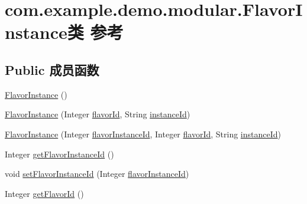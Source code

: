 \hypertarget{classcom_1_1example_1_1demo_1_1modular_1_1_flavor_instance}{}\section{com.\+example.\+demo.\+modular.\+Flavor\+Instance类 参考}
\label{classcom_1_1example_1_1demo_1_1modular_1_1_flavor_instance}
\subsection*{Public 成员函数}
\begin{DoxyCompactItemize}
\item 
\mbox{\hyperlink{classcom_1_1example_1_1demo_1_1modular_1_1_flavor_instance_a6766a0880151dfcfa45000004e7a7c0d}{Flavor\+Instance}} ()
\item 
\mbox{\hyperlink{classcom_1_1example_1_1demo_1_1modular_1_1_flavor_instance_a2fc106a94626fac403ef823cf3f3c798}{Flavor\+Instance}} (Integer \mbox{\hyperlink{classcom_1_1example_1_1demo_1_1modular_1_1_flavor_instance_a5fec5cc000969e9df587092cde1e8f74}{flavor\+Id}}, String \mbox{\hyperlink{classcom_1_1example_1_1demo_1_1modular_1_1_flavor_instance_a23acce4e9de728d5d043d066c2e94960}{instance\+Id}})
\item 
\mbox{\hyperlink{classcom_1_1example_1_1demo_1_1modular_1_1_flavor_instance_a6d4edb0af1756c461b59e71560ebbc25}{Flavor\+Instance}} (Integer \mbox{\hyperlink{classcom_1_1example_1_1demo_1_1modular_1_1_flavor_instance_a25d43d7dc6d26bde218adf5b5fb9dd0e}{flavor\+Instance\+Id}}, Integer \mbox{\hyperlink{classcom_1_1example_1_1demo_1_1modular_1_1_flavor_instance_a5fec5cc000969e9df587092cde1e8f74}{flavor\+Id}}, String \mbox{\hyperlink{classcom_1_1example_1_1demo_1_1modular_1_1_flavor_instance_a23acce4e9de728d5d043d066c2e94960}{instance\+Id}})
\item 
Integer \mbox{\hyperlink{classcom_1_1example_1_1demo_1_1modular_1_1_flavor_instance_af8e4308248eb3d2a6f74f48a60bf544e}{get\+Flavor\+Instance\+Id}} ()
\item 
void \mbox{\hyperlink{classcom_1_1example_1_1demo_1_1modular_1_1_flavor_instance_afab8f756ddab15d938f26e1216d8c20a}{set\+Flavor\+Instance\+Id}} (Integer \mbox{\hyperlink{classcom_1_1example_1_1demo_1_1modular_1_1_flavor_instance_a25d43d7dc6d26bde218adf5b5fb9dd0e}{flavor\+Instance\+Id}})
\item 
Integer \mbox{\hyperlink{classcom_1_1example_1_1demo_1_1modular_1_1_flavor_instance_a2a71092eeda8a5a30c6b74ac8632e2de}{get\+Flavor\+Id}} ()

\end{DoxyCompactItemize}
